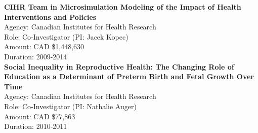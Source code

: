 \documentclass[
  letterpaper,
  DIV=11,
  numbers=noendperiod]{scrartcl}
\begin{document}
\textbf{CIHR Team in Microsimulation Modeling of the Impact of Health
Interventions and Policies}\\
\hspace*{0.333em}\hspace*{0.333em}\hspace*{0.333em}\hspace*{0.333em}Agency:
Canadian Institutes for Health Research\\
\hspace*{0.333em}\hspace*{0.333em}\hspace*{0.333em}\hspace*{0.333em}Role:
Co-Investigator (PI: Jacek Kopec)\\
\hspace*{0.333em}\hspace*{0.333em}\hspace*{0.333em}\hspace*{0.333em}Amount:
CAD \$1,448,630\\
\hspace*{0.333em}\hspace*{0.333em}\hspace*{0.333em}\hspace*{0.333em}Duration:
2009-2014\\

\textbf{Social Inequality in Reproductive Health: The Changing Role of
Education as a Determinant of Preterm Birth and Fetal Growth Over
Time}\\
\hspace*{0.333em}\hspace*{0.333em}\hspace*{0.333em}\hspace*{0.333em}Agency:
Canadian Institutes for Health Research\\
\hspace*{0.333em}\hspace*{0.333em}\hspace*{0.333em}\hspace*{0.333em}Role:
Co-Investigator (PI: Nathalie Auger)\\
\hspace*{0.333em}\hspace*{0.333em}\hspace*{0.333em}\hspace*{0.333em}Amount:
CAD \$77,863\\
\hspace*{0.333em}\hspace*{0.333em}\hspace*{0.333em}\hspace*{0.333em}Duration:
2010-2011\\
\end{document}
